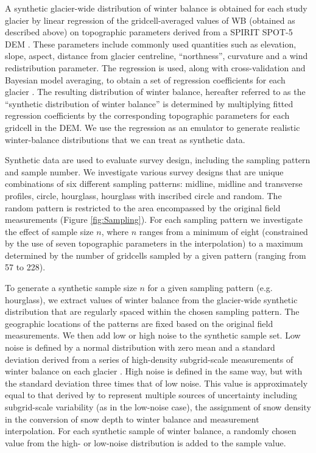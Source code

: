\documentclass{article}
\begin{document}
A synthetic glacier-wide distribution of winter balance is obtained for each study glacier by linear regression of the gridcell-averaged values of WB (obtained as described above) on topographic parameters derived from a SPIRIT SPOT-5 DEM \citep{Korona2009}. These parameters include commonly used quantities \citep[e.g.][]{McGrath2015} such as elevation, slope, aspect, distance from glacier centreline, ``northness'', curvature and a wind redistribution parameter. The regression is used, along with cross-validation and Bayesian model averaging, to obtain a set of regression coefficients for each glacier  \citep{Pulwicki2017}. The resulting distribution of winter balance, hereafter referred to as the ``synthetic distribution of winter balance'' is determined by multiplying fitted regression coefficients by the corresponding topographic parameters for each gridcell in the DEM. We use the regression as an emulator to generate realistic winter-balance distributions that we can treat as synthetic data. 

Synthetic data are used to evaluate survey design, including the sampling pattern and sample number. 
We investigate various survey designs that are unique combinations of six different sampling patterns: midline, midline and transverse profiles, circle, hourglass, hourglass with inscribed circle and random. The random pattern is restricted to the area encompassed by the original field measurements (Figure \ref{fig:Sampling}). 
For each sampling pattern we investigate the effect of sample size $n$, where $n$ ranges from a minimum of eight (constrained by the use of seven topographic parameters in the interpolation) to a maximum determined by the number of gridcells sampled by a given pattern (ranging from 57 to 228). 

To generate a synthetic sample size $n$ for a given sampling pattern (e.g. hourglass), we extract values of winter balance from the glacier-wide synthetic distribution 
that are regularly spaced within the chosen sampling pattern. The geographic locations of the patterns are fixed based on the original field measurements.    
We then add low or high noise to the synthetic sample set. Low noise is defined by a normal distribution with zero mean and a standard deviation derived from a series of high-density subgrid-scale measurements of winter balance on each glacier \citep{Pulwicki2017}.  
High noise is defined in the same way, but with the standard deviation three times that of low noise. This value is approximately equal to that derived by \citet{Pulwicki2017} to represent multiple sources of uncertainty including subgrid-scale variability (as in the low-noise case), the assignment of snow density in the conversion of snow depth to winter balance and measurement interpolation.
For each synthetic sample of winter balance, a randomly chosen value from the high- or low-noise distribution is added to the sample value.
\end{document}
